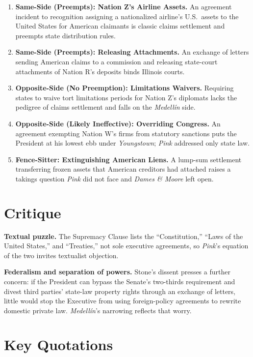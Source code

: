 \documentclass[12pt]{article}
\begin{document}
\begin{enumerate}
\item \textbf{Same-Side (Preempts): Nation Z's Airline Assets.} An agreement incident to recognition assigning a nationalized airline's U.S.\ assets to the United States for American claimants is classic claims settlement and preempts state distribution rules.
\item \textbf{Same-Side (Preempts): Releasing Attachments.} An exchange of letters sending American claims to a commission and releasing state-court attachments of Nation R's deposits binds Illinois courts.
\item \textbf{Opposite-Side (No Preemption): Limitations Waivers.} Requiring states to waive tort limitations periods for Nation Z's diplomats lacks the pedigree of claims settlement and falls on the \textit{Medell\'in} side.
\item \textbf{Opposite-Side (Likely Ineffective): Overriding Congress.} An agreement exempting Nation W's firms from statutory sanctions puts the President at his lowest ebb under \textit{Youngstown}; \textit{Pink} addressed only state law.
\item \textbf{Fence-Sitter: Extinguishing American Liens.} A lump-sum settlement transferring frozen assets that American creditors had attached raises a takings question \textit{Pink} did not face and \textit{Dames \& Moore} left open.
\end{enumerate}

\section{Critique}

\textbf{Textual puzzle.} The Supremacy Clause lists the ``Constitution,'' ``Laws of the United States,'' and ``Treaties,'' not sole executive agreements, so \textit{Pink}'s equation of the two invites textualist objection.

\textbf{Federalism and separation of powers.} Stone's dissent presses a further concern: if the President can bypass the Senate's two-thirds requirement and divest third parties' state-law property rights through an exchange of letters, little would stop the Executive from using foreign-policy agreements to rewrite domestic private law. \textit{Medell\'in}'s narrowing reflects that worry.

\section{Key Quotations}
\end{document}
